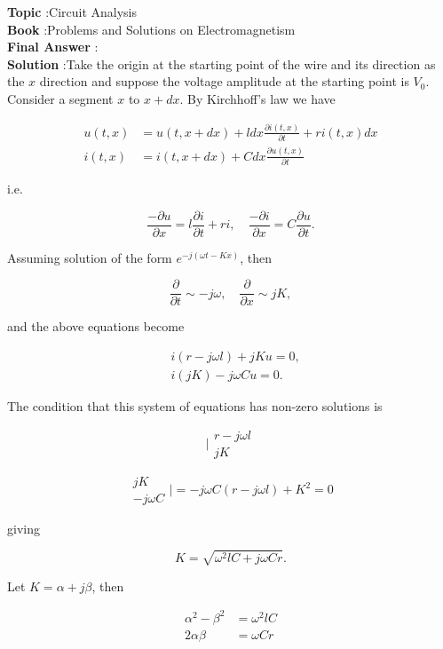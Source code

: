 \documentclass[10pt]{article}
\begin{document}
\textbf{Topic} :Circuit Analysis\\
\textbf{Book} :Problems and Solutions on Electromagnetism\\
\textbf{Final Answer} :\infty\\


\textbf{Solution} :Take the origin at the starting point of the wire and its direction as the $x$ direction and suppose the voltage amplitude at the starting point is $V_{0}$. Consider a segment $x$ to $x+d x$. By Kirchhoff's law we have

$$
\begin{aligned}
u(t, x) &=u(t, x+d x)+l d x \frac{\partial i(t, x)}{\partial t}+r i(t, x) d x \\
i(t, x) &=i(t, x+d x)+C d x \frac{\partial u(t, x)}{\partial t}
\end{aligned}
$$

i.e.

$$
\frac{-\partial u}{\partial x}=l \frac{\partial i}{\partial t}+r i, \quad \frac{-\partial i}{\partial x}=C \frac{\partial u}{\partial t} .
$$

Assuming solution of the form $e^{-j(\omega t-K x)}$, then

$$
\frac{\partial}{\partial t} \sim-j \omega, \quad \frac{\partial}{\partial x} \sim j K,
$$

and the above equations become

$$
\begin{aligned}
&i(r-j \omega l)+j K u=0, \\
&i(j K)-j \omega C u=0 .
\end{aligned}
$$

The condition that this system of equations has non-zero solutions is

$$
\mid \begin{gathered}
r-j \omega l \\
j K
\end{gathered}
$$

$$
\begin{gathered}
j K \\
-j \omega C
\end{gathered} \mid=-j \omega C(r-j \omega l)+K^{2}=0
$$

giving

$$
K=\sqrt{\omega^{2} l C+j \omega C r} .
$$

Let $K=\alpha+j \beta$, then

$$
\begin{aligned}
\alpha^{2}-\beta^{2} &=\omega^{2} l C \\
2 \alpha \beta &=\omega C r
\end{aligned}
$$
\end{document}
